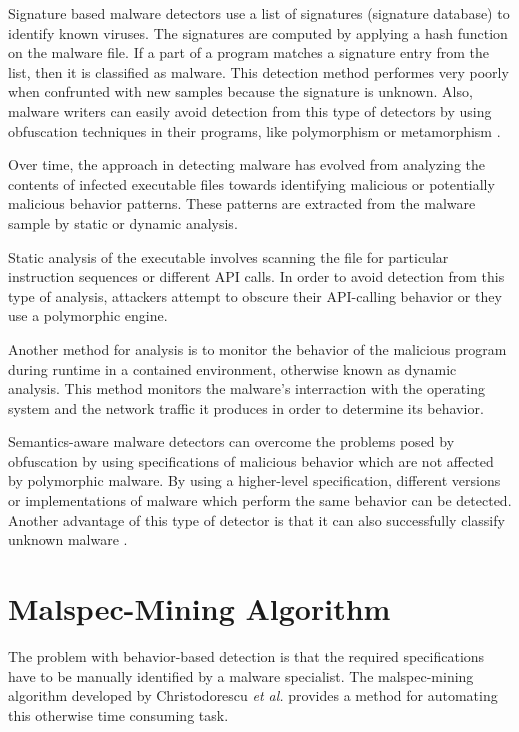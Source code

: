 Signature based malware detectors use a list of signatures (signature database) to identify known viruses. The signatures are computed by applying a hash function on the malware file. If a part of a program matches a signature entry from the list, then it is classified as malware. This detection method performes very poorly when confrunted with new samples because the signature is unknown. Also, malware writers can easily avoid detection from this type of detectors by using obfuscation techniques in their programs, like polymorphism or metamorphism \cite{mining-specifications}. 

Over time, the approach in detecting malware has evolved from analyzing the contents of infected executable files towards identifying malicious or potentially malicious behavior patterns. These patterns are extracted from the malware sample by static or dynamic analysis.

Static analysis of the executable involves scanning the file for particular instruction sequences or different API calls. In order to avoid detection from this type of analysis, attackers attempt to obscure their API-calling behavior or they use a polymorphic engine.

Another method for analysis is to monitor the behavior of the malicious program during runtime in a contained environment, otherwise known as dynamic analysis. This method monitors the malware's interraction with the operating system and the network traffic it produces in order to determine its behavior.

Semantics-aware malware detectors can overcome the problems posed by obfuscation by using specifications of malicious behavior which are not affected by polymorphic malware. By using a higher-level specification, different versions or implementations of malware which perform the same behavior can be detected. Another advantage of this type of detector is that it can also successfully classify unknown malware \cite{semantics-based-detection}.

\section{Malspec-Mining Algorithm}
\label{sec:malspec-alg}

The problem with behavior-based detection is that the required specifications have to be manually identified by a malware specialist. The malspec-mining algorithm developed by Christodorescu \textit{et al.} \cite{mining-specifications} provides a method for automating this otherwise time consuming task. 

